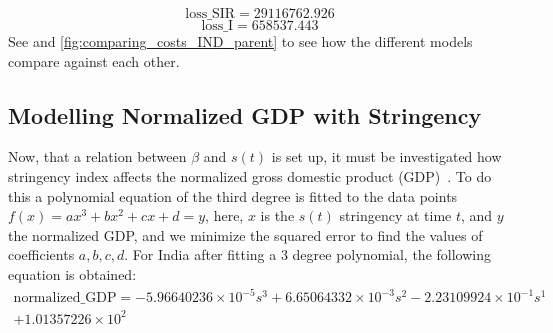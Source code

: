 \documentclass[tikz,fleqn,12pt]{wlscirep}
\begin{document}
\begin{equation}
  \textrm{loss\_SIR} = 29116762.926
  \label{eq:cost_SIR_with_lockdown_and_time_varying_nu}
\end{equation}
\begin{equation}
  \textrm{loss\_I} = 658537.443
  \label{eq:cost_I_with_lockdown_and_time_varying_nu}
\end{equation}
See  and \cref{fig:comparing_costs_IND_parent} to see how the different models compare against each other.

\subsection{Modelling Normalized GDP with Stringency}
Now, that a relation between $\beta$ and $s(t)$ is set up, it must be investigated how stringency index affects the normalized gross domestic product (GDP)~\cite{OECDNormalizedGDP,OECDNormalizedGDP2}. To do this a polynomial equation of the third degree is fitted to the data points $f(x) = a x^3 + b x^2 + c x + d = y$, here, $x$ is the $s(t)$ stringency at time $t$, and $y$ the normalized GDP, and we minimize the squared error to find the values of coefficients $a, b, c, d$. For India after fitting a 3 degree polynomial, the following equation is obtained:
\begin{equation}
    \begin{split}
      \textrm{normalized\_GDP} = -5.96640236 \times 10^{-5} s^{3} + 6.65064332 \times 10^{-3} s^{2} - 2.23109924 \times 10^{-1} s^{1} \\
    + 1.01357226 \times 10^{2}
    \end{split}
    \label{eq:gdp_modelled_with_stringency_IND}
\end{equation}
\end{document}
